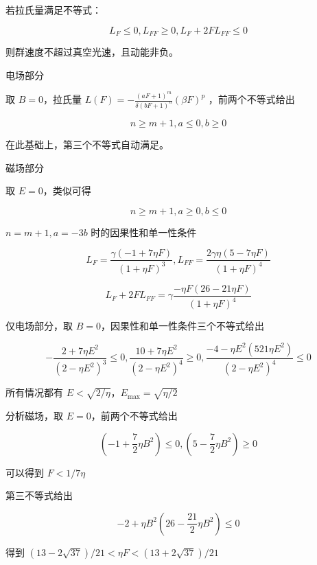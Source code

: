 \documentclass[9pt, dvipsnames]{beamer} %
\begin{document}
\begin{frame}
    若拉氏量满足不等式：

    $$
    L_F \leqslant 0,
    L_{FF}\geqslant 0,
    L_F + 2F L_{FF} \leqslant 0
    $$
    
    则群速度不超过真空光速，且动能非负。
    
     电场部分
    
    取 $B=0 $，拉氏量 $\displaystyle{L(F)=-\frac{\left(aF+1 \right)^m }{\delta(bF+1)^n } \left(\beta F \right)^p }$ ，前两个不等式给出
    
    $$
    n\geqslant m+1,a\leqslant 0,b\geqslant 0
    $$
    
    在此基础上，第三个不等式自动满足。
    
    磁场部分
    
    取 $E=0 $，类似可得
    
    $$
    n\geqslant m+1,a\geqslant 0,b\leqslant 0
    $$
    
    $n=m+1,a=-3b $ 时的因果性和单一性条件
    
    $$
    L_F
    =\frac{\gamma\left(-1+7\eta F \right) }{\left(1+\eta F \right)^3 },
    L_{FF}
    =\frac{2\gamma \eta\left(5-7\eta F \right) }{\left(1+\eta F \right)^4 } 
    $$
    
    $$
    L_F + 2FL_{FF} 
    =\gamma \frac{-\eta F\left(26-21\eta F \right) }{\left(1+\eta F \right)^4 }
    $$
\end{frame}

\begin{frame}
    仅电场部分，取 $B=0 $，因果性和单一性条件三个不等式给出
    
    $$
    -\frac{2+7\eta E^2 }{\left(2-\eta E^2 \right)^3 } \leqslant 0,
    \frac{10+7\eta E^2 }{\left(2-\eta E^2 \right)^4 } \geqslant 0,
    \frac{-4-\eta E^2\left(521\eta E^2 \right) }{\left(2-\eta E^2 \right)^4 } \leqslant 0
    $$
    
    
    所有情况都有 $E<\sqrt{2/\eta} $，$E_{\max}=\sqrt{\eta/2} $
    
    分析磁场，取 $E=0 $，前两个不等式给出
    
    $$
    \left(-1+\frac{7 }{2 } \eta B^2 \right)\leqslant 0,
    \left(5-\frac{7 }{2 } \eta B^2 \right)\geqslant 0
    $$
    
    可以得到 $F<1/7\eta $
    
    第三不等式给出
    
    $$
    -2+\eta B^2\left(26-\frac{21 }{2 } \eta B^2 \right)\leqslant 0
    $$
    
    得到 $(13-2\sqrt{37})/21<\eta F<(13+2\sqrt{37})/21 $
\end{frame}
\end{document}
